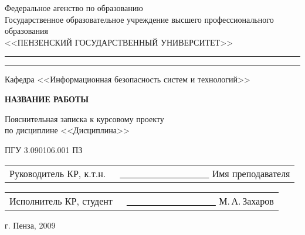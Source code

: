 \newpage
\begin{singlespace}
\begin{center}
Федеральное агенство по образованию  \\
Государственное образовательное учреждение высшего профессионального образования \\
\vspace{0.25cm}
<<ПЕНЗЕНСКИЙ ГОСУДАРСТВЕННЫЙ УНИВЕРСИТЕТ>> \\
\medskip 
    \hrule height 1pt
      \vskip 1pt 
      \hrule
      \vskip 3pt
Кафедра <<Информационная безопасность систем и технологий>>
\end{center}
\end{singlespace}

\vspace{8em}

\begin{center}
\textsc{\textbf{НАЗВАНИЕ РАБОТЫ}}
\end{center}

\begin{center}
Пояснительная записка к курсовому проекту \\
по дисциплине <<Дисциплина>>
\end{center}

\begin{center}
ПГУ 3.090106.001 ПЗ
\end{center}

\vspace{6em}
  \begin{tabular}{p{60mm}p{80mm}}
    Руководитель КР, \newline
    к.т.н.
   &
    ~\newline\underline{~~~~~~~~~~~~~~~~~~~} Имя преподавателя \newline
  \end{tabular}
  
   \begin{tabular}{p{60mm}p{80mm}}
    Исполнитель КР, \newline
    студент
   &
    ~\newline\underline{~~~~~~~~~~~~~~~~~~~} М.\,А.\,Захаров \newline
  \end{tabular}

\vspace{\fill}
\begin{center}
г. Пенза, 2009 
\end{center}
\newpage
